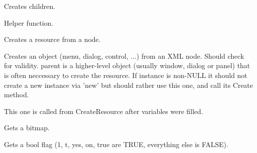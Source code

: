 
Creates children.


\label{wxxmlresourcehandlercreatechildrenprivately}


Helper function.


\label{wxxmlresourcehandlercreateresfromnode}


Creates a resource from a node.


\label{wxxmlresourcehandlercreateresource}


Creates an object (menu, dialog, control, ...) from an XML node.
Should check for validity.
parent is a higher-level object (usually window, dialog or panel)
that is often neccessary to create the resource.
If instance is non-NULL it should not create a new instance via 'new' but
should rather use this one, and call its Create method.


\label{wxxmlresourcehandlerdocreateresource}


This one is called from CreateResource after variables
were filled.


\label{wxxmlresourcehandlergetbitmap}


Gets a bitmap.


\label{wxxmlresourcehandlergetbool}


Gets a bool flag (1, t, yes, on, true are TRUE, everything else is FALSE).


